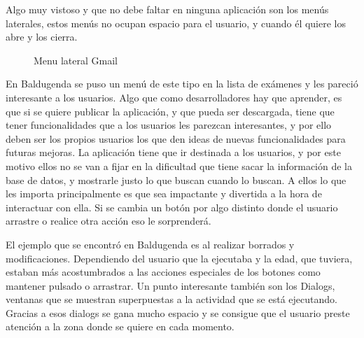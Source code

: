  
Algo muy vistoso y que no debe faltar en ninguna aplicación son los menús laterales, estos menús no ocupan espacio para el usuario, y cuando él quiere los abre y los cierra.
\newpage
\begin{figure}[H] 
  \begin{center} 
    \caption{Menu lateral Gmail} 
    \label{fig:MenuLateral} 
  \end{center} 
\end{figure}

En Baldugenda se puso un menú de este tipo en la lista de exámenes y les pareció interesante a los usuarios.
Algo que como desarrolladores hay que aprender, es que si se quiere publicar la aplicación, y que pueda ser descargada, tiene que tener funcionalidades que a los usuarios les parezcan interesantes, y por ello deben ser los propios usuarios los que den ideas de nuevas funcionalidades para futuras mejoras. La aplicación tiene que ir destinada a los usuarios, y por este motivo ellos no se van a fijar en la dificultad que tiene sacar la información de la base de datos, y mostrarle justo lo que buscan cuando lo buscan.
A ellos lo que les importa principalmente es que sea impactante y divertida a la hora de interactuar con ella.
Si se cambia un botón por algo distinto donde el usuario arrastre o realice otra acción eso le sorprenderá.

El ejemplo que se encontró en Baldugenda es al realizar borrados y modificaciones.
Dependiendo del usuario que la ejecutaba y la edad, que tuviera, estaban más acostumbrados a las acciones especiales de los botones como mantener pulsado o arrastrar.
Un punto interesante también son los Dialogs, ventanas que se muestran superpuestas a la actividad que se está ejecutando. Gracias a esos dialogs se gana mucho espacio y se consigue que el usuario preste atención a la zona donde se quiere en cada momento.

